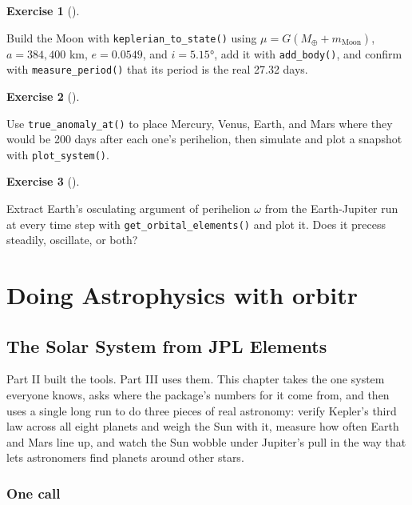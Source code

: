 \documentclass[
  10.5pt,
  letterpaper,
]{scrbook}
\theoremstyle{definition}
\newtheorem{exercise}{Exercise}[chapter]
\theoremstyle{plain}
\theoremstyle{remark}
\begin{document}
\begin{exercise}[]\protect\hypertarget{exr-ch7-moon-fix}{}\label{exr-ch7-moon-fix}

Build the Moon with \texttt{keplerian\_to\_state()} using
\(\mu = G(M_\oplus + m_{\mathrm{Moon}})\), \(a = 384{,}400\) km,
\(e = 0.0549\), and \(i = 5.15°\), add it with \texttt{add\_body()}, and
confirm with \texttt{measure\_period()} that its period is the real
27.32 days.

\end{exercise}

\begin{exercise}[]\protect\hypertarget{exr-ch7-spread}{}\label{exr-ch7-spread}

Use \texttt{true\_anomaly\_at()} to place Mercury, Venus, Earth, and
Mars where they would be 200 days after each one's perihelion, then
simulate and plot a snapshot with \texttt{plot\_system()}.

\end{exercise}

\begin{exercise}[]\protect\hypertarget{exr-ch7-precession}{}\label{exr-ch7-precession}

Extract Earth's osculating argument of perihelion \(\omega\) from the
Earth-Jupiter run at every time step with
\texttt{get\_orbital\_elements()} and plot it. Does it precess steadily,
oscillate, or both?

\end{exercise}

\part{Doing Astrophysics with orbitr}

\chapter{The Solar System from JPL Elements}\label{sec-solar-system}

Part II built the tools. Part III uses them. This chapter takes the one
system everyone knows, asks where the package's numbers for it come
from, and then uses a single long run to do three pieces of real
astronomy: verify Kepler's third law across all eight planets and weigh
the Sun with it, measure how often Earth and Mars line up, and watch the
Sun wobble under Jupiter's pull in the way that lets astronomers find
planets around other stars.

\section{One call}\label{one-call}
\end{document}
